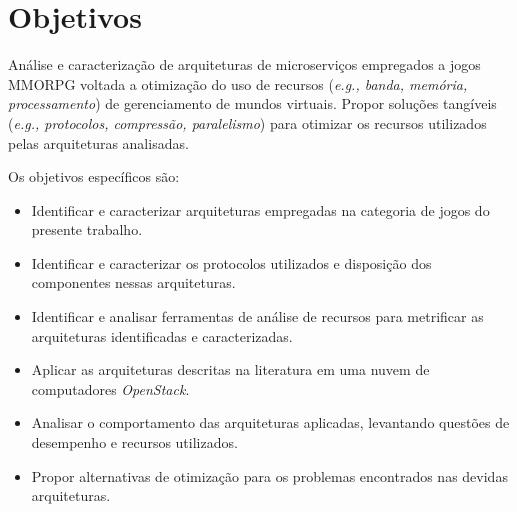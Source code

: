 \section{Objetivos}
\label{obj}

Análise e caracterização de arquiteturas de microserviços empregados a jogos MMORPG voltada a otimização do uso de recursos (\textit{e.g., banda, memória, processamento}) de gerenciamento de mundos virtuais. Propor soluções tangíveis (\textit{e.g., protocolos, compressão, paralelismo}) para otimizar os recursos utilizados pelas arquiteturas analisadas.

Os objetivos específicos são:
\begin{itemize}
    \item Identificar e caracterizar arquiteturas empregadas na categoria de jogos do presente trabalho.
    \item Identificar e caracterizar os protocolos utilizados e disposição dos componentes nessas arquiteturas.
    \item Identificar e analisar ferramentas de análise de recursos para metrificar as arquiteturas identificadas e caracterizadas.
    \item Aplicar as arquiteturas descritas na literatura em uma nuvem de computadores \textit{OpenStack}.
    \item Analisar o comportamento das arquiteturas aplicadas, levantando questões de desempenho e recursos utilizados.
    \item Propor alternativas de otimização para os problemas encontrados nas devidas arquiteturas.
\end{itemize}
